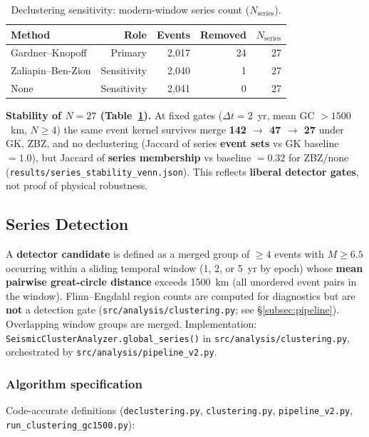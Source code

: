 \documentclass[draft]{agujournal2019}
\begin{document}
\begin{table}[htbp]
\centering
\caption{Declustering sensitivity: modern-window series count ($N_\mathrm{series}$).}
\label{tab:gk_zbz}
\begin{tabular}{lrrrr}
\hline
Method & Role & Events & Removed & $N_\mathrm{series}$ \\
\hline
Gardner--Knopoff & Primary & 2{,}017 & 24 & 27 \\
Zaliapin--Ben-Zion & Sensitivity & 2{,}040 & 1 & 27 \\
None & Sensitivity & 2{,}041 & 0 & 27 \\
\hline
\end{tabular}
\end{table}

\noindent\textbf{Stability of $N=27$ (Table~\ref{tab:gk_zbz}).}
At fixed gates ($\Delta t = 2$~yr, mean GC $> 1500$~km, $N \ge 4$) the same
event kernel survives merge \textbf{142 $\to$ 47 $\to$ 27} under GK, ZBZ, and
no declustering (Jaccard of series \textbf{event sets} vs GK baseline $= 1.0$),
but Jaccard of \textbf{series membership} vs baseline $= 0.32$ for ZBZ/none
(\texttt{results/series\_stability\_venn.json}).
This reflects \textbf{liberal detector gates}, not proof of physical robustness.

\subsection{Series Detection}
\label{subsec:series-detection}

A \textbf{detector candidate} is defined as a merged group of $\ge 4$
events with $M \ge 6.5$ occurring within a sliding temporal window
(1, 2, or 5~yr by epoch) whose \textbf{mean pairwise great-circle distance}
exceeds 1500~km (all unordered event pairs in the window).
Flinn--Engdahl region counts are computed for diagnostics but are
\textbf{not} a detection gate (\texttt{src/analysis/clustering.py};
see \S\ref{subsec:pipeline}).
Overlapping window groups are merged.
Implementation: \texttt{SeismicClusterAnalyzer.global\_series()} in
\texttt{src/analysis/clustering.py}, orchestrated by
\texttt{src/analysis/pipeline\_v2.py}.

\subsubsection{Algorithm specification}
\label{subsubsec:algo-spec}

Code-accurate definitions (\texttt{declustering.py}, \texttt{clustering.py},
\texttt{pipeline\_v2.py}, \texttt{run\_clustering\_gc1500.py}):
\end{document}
